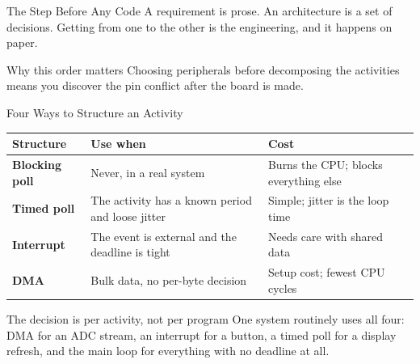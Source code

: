 \documentclass[9pt,aspectratio=169,xcolor=table]{beamer}
\newcommand{\striped}{\rowcolors{1}{white}{stripe}}
\begin{document}
\begin{frame}{The Step Before Any Code}
    \leavevmode
    A requirement is prose. An architecture is a set of decisions. Getting from
    one to the other is \alert{the engineering}, and it happens on paper.

    \vspace{3mm}
    \begin{center}
    \end{center}

    \vspace{2mm}
    \begin{block}{Why this order matters}
        Choosing peripherals before decomposing the activities means you discover
        the pin conflict \alert{after} the board is made.
    \end{block}
\end{frame}

\begin{frame}{Four Ways to Structure an Activity}
    \begin{center}
    {\small
    \striped
    \begin{tabular}{@{}l R{.34\textwidth} R{.32\textwidth}@{}}
        \toprule
        \textbf{Structure} & \textbf{Use when} & \textbf{Cost} \\
        \midrule
        \textbf{Blocking poll} & Never, in a real system & Burns the CPU; blocks everything else \\
        \textbf{Timed poll} & The activity has a known period and loose jitter & Simple; jitter is the loop time \\
        \textbf{Interrupt} & The event is external and the deadline is tight & Needs care with shared data \\
        \textbf{DMA} & Bulk data, no per-byte decision & Setup cost; fewest CPU cycles \\
        \bottomrule
    \end{tabular}}
    \end{center}

    \vspace{3mm}
    \begin{block}{The decision is per activity, not per program}
        One system routinely uses all four: DMA for an ADC stream, an interrupt
        for a button, a timed poll for a display refresh, and the main loop for
        everything with no deadline at all.
    \end{block}
\end{frame}
\end{document}
